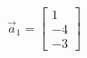 \documentclass[preview]{standalone}
\begin{document}
\begin{align*}
\vec{a}_1=\begin{bmatrix} 1 \\ -4 \\ -3 \end{bmatrix}
\end{align*}
\end{document}
